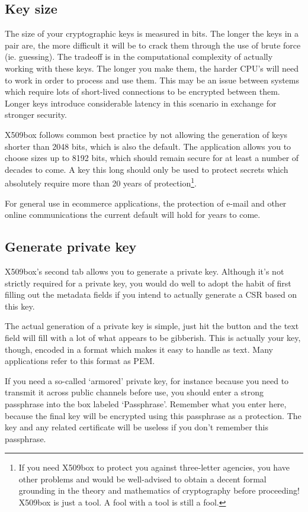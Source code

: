 \documentclass[a4paper,12pt]{article}
\begin{document}
\subsection{Key size}
The size of your cryptographic keys is measured in bits. The longer the keys in a pair are, the more difficult it will be to crack them through the use of brute force (ie. guessing). The tradeoff is in the computational complexity of actually working with these keys. The longer you make them, the harder CPU's will need to work in order to process and use them. This may be an issue between systems which require lots of short-lived connections to be encrypted between them. Longer keys introduce considerable latency in this scenario in exchange for stronger security.

X509box follows common best practice by not allowing the generation of keys shorter than 2048 bits, which is also the default. The application allows you to choose sizes up to 8192 bits, which should remain secure for at least a number of decades to come. A key this long should only be used to protect secrets which absolutely require more than 20 years of protection\footnote{If you need X509box to protect you against three-letter agencies, you have other problems and would be well-advised to obtain a decent formal grounding in the theory and mathematics of cryptography before proceeding! X509box is just a tool. A fool with a tool is still a fool.}.

For general use in ecommerce applications, the protection of e-mail and other online communications the current default will hold for years to come.

\subsection{Generate private key}
X509box's second tab allows you to generate a private key. Although it's not strictly required for a private key, you would do well to adopt the habit of first filling out the metadata fields if you intend to actually generate a CSR based on this key.

The actual generation of a private key is simple, just hit the button and the text field will fill with a lot of what appears to be gibberish. This is actually your key, though, encoded in a format which makes it easy to handle as text. Many applications refer to this format as PEM.

If you need a so-called `armored' private key, for instance because you need to transmit it across public channels before use, you should enter a strong passphrase into the box labeled `Passphrase'. Remember what you enter here, because the final key will be encrypted using this passphrase as a protection. The key and any related certificate will be useless if you don't remember this passphrase.
\end{document}
